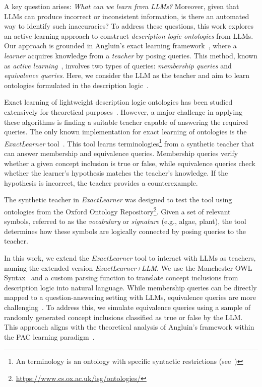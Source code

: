 %
A key question arises: \emph{What can we learn from \glspl{LLM}?}
%
Moreover, given that \glspl{LLM} can produce incorrect or inconsistent information, is there an automated way to identify such inaccuracies?
%
To address these questions, this work explores an active learning approach to construct \emph{description logic ontologies} from \glspl{LLM}.
%
Our approach is grounded in Angluin's exact learning framework~\cite{DBLP:journals/ml/Angluin87}, where a \emph{learner} acquires knowledge from a \emph{teacher} by posing queries.
%
This method, known as \emph{active learning}~\cite{DBLP:conf/stoc/Angluin92}, involves two types of queries: \emph{membership queries} and \emph{equivalence queries}.
%
Here, we consider the \gls{LLM} as the teacher and aim to learn ontologies formulated in the \EL description logic~\cite{DBLP:conf/ijcai/BaaderBL05}.

%
Exact learning of lightweight description logic ontologies has been studied extensively for theoretical purposes~\cite{DBLP:conf/ijcai/FunkJLPW19,DBLP:conf/ijcai/FunkJL21,DBLP:conf/aaai/KonevOW16,DBLP:journals/jmlr/KonevLOW17,DBLP:conf/dlog/OzakiPM20}.
%
However, a major challenge in applying these algorithms is finding a suitable teacher capable of answering the required queries.
%
The only known implementation for exact learning of \EL ontologies is the \emph{ExactLearner} tool~\cite{DBLP:conf/kr/DuarteKO18}.
%
This tool learns \EL terminologies\footnote{An \EL terminology is an ontology with specific syntactic restrictions (see~)} from a synthetic teacher that can answer membership and equivalence queries.
%
Membership queries verify whether a given concept inclusion is true or false, while equivalence queries check whether the learner's hypothesis matches the teacher's knowledge.
%
If the hypothesis is incorrect, the teacher provides a counterexample.

%
The synthetic teacher in \emph{ExactLearner} was designed to test the tool using ontologies from the Oxford Ontology Repository\footnote{\url{https://www.cs.ox.ac.uk/isg/ontologies/}}.
%
Given a set of relevant symbols, referred to as the \emph{vocabulary} or \emph{signature} (e.g., algae, plant), the tool determines how these symbols are logically connected by posing queries to the teacher.

%
In this work, we extend the \emph{ExactLearner} tool to interact with \glspl{LLM} as teachers, naming the extended version \emph{ExactLearner+LLM}.
%
We use the Manchester OWL Syntax~\cite{DBLP:conf/owled/HorridgeDGRSW06} and a custom parsing function to translate concept inclusions from description logic into natural language.
%
While membership queries can be directly mapped to a question-answering setting with \glspl{LLM}, equivalence queries are more challenging~\cite{DBLP:journals/ml/WeissGY24,BLUM2023109026}.
%
To address this, we simulate equivalence queries using a sample of randomly generated concept inclusions classified as true or false by the \gls{LLM}.
%
This approach aligns with the theoretical analysis of Angluin's framework within the \gls{PAC} learning paradigm~\cite{DBLP:journals/ml/Angluin87}.

